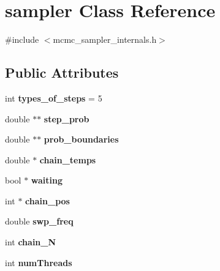 \hypertarget{classsampler}{}\section{sampler Class Reference}
\label{classsampler}


{\ttfamily \#include $<$mcmc\+\_\+sampler\+\_\+internals.\+h$>$}

\subsection*{Public Attributes}
\begin{DoxyCompactItemize}
\item 
\mbox{\label{classsampler_a0a556351f7c28b8577e5e7f8106ae626}} 
int {\bfseries types\+\_\+of\+\_\+steps} = 5
\item 
\mbox{\label{classsampler_a5970eec37aea2dc10223ef31668bc2c8}} 
double $\ast$$\ast$ {\bfseries step\+\_\+prob}
\item 
\mbox{\label{classsampler_adc62297d359d487fc09358b69df3baba}} 
double $\ast$$\ast$ {\bfseries prob\+\_\+boundaries}
\item 
\mbox{\label{classsampler_aeab13d23abfd6582959f82201306bbd9}} 
double $\ast$ {\bfseries chain\+\_\+temps}
\item 
\mbox{\label{classsampler_a962e2016c8c5304d84731b34d603b221}} 
bool $\ast$ {\bfseries waiting}
\item 
\mbox{\label{classsampler_a8d6b552c3e3f330fabdfdab1d214bb0c}} 
int $\ast$ {\bfseries chain\+\_\+pos}
\item 
\mbox{\label{classsampler_af02dde10e178c15057266bd33783f9eb}} 
double {\bfseries swp\+\_\+freq}
\item 
\mbox{\label{classsampler_a7ef923424ae51147137ed36e02e7ca29}} 
int {\bfseries chain\+\_\+N}
\item 
\mbox{\label{classsampler_a67740d4b88501036e9f05955d4664708}} 
int {\bfseries num\+Threads}
\item 

\end{DoxyCompactItemize}
